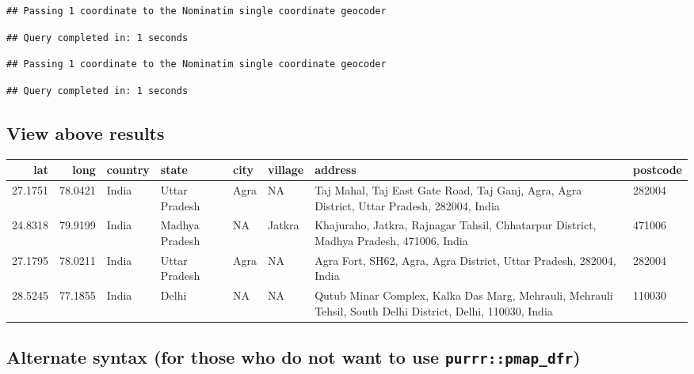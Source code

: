 \documentclass[
]{book}
\begin{document}
\begin{verbatim}
## Passing 1 coordinate to the Nominatim single coordinate geocoder
\end{verbatim}

\begin{verbatim}
## Query completed in: 1 seconds
\end{verbatim}

\begin{verbatim}
## Passing 1 coordinate to the Nominatim single coordinate geocoder
\end{verbatim}

\begin{verbatim}
## Query completed in: 1 seconds
\end{verbatim}

\hypertarget{view-above-results}{%
\subsection{View above results}\label{view-above-results}}

\begin{tabular}{r|r|l|l|l|l|l|l}
\hline
lat & long & country & state & city & village & address & postcode\\
\hline
27.1751 & 78.0421 & India & Uttar Pradesh & Agra & NA & Taj Mahal, Taj East Gate Road, Taj Ganj, Agra, Agra District, Uttar Pradesh, 282004, India & 282004\\
\hline
24.8318 & 79.9199 & India & Madhya Pradesh & NA & Jatkra & Khajuraho, Jatkra, Rajnagar Tahsil, Chhatarpur District, Madhya Pradesh, 471006, India & 471006\\
\hline
27.1795 & 78.0211 & India & Uttar Pradesh & Agra & NA & Agra Fort, SH62, Agra, Agra District, Uttar Pradesh, 282004, India & 282004\\
\hline
28.5245 & 77.1855 & India & Delhi & NA & NA & Qutub Minar Complex, Kalka Das Marg, Mehrauli, Mehrauli Tehsil, South Delhi District, Delhi, 110030, India & 110030\\
\hline
\end{tabular}

\hypertarget{alternate-syntax-for-those-who-do-not-want-to-use-purrrpmap_dfr}{%
\subsection{\texorpdfstring{Alternate syntax (for those who do not want to use \texttt{purrr::pmap\_dfr})}{Alternate syntax (for those who do not want to use purrr::pmap\_dfr)}}\label{alternate-syntax-for-those-who-do-not-want-to-use-purrrpmap_dfr}}
\end{document}
